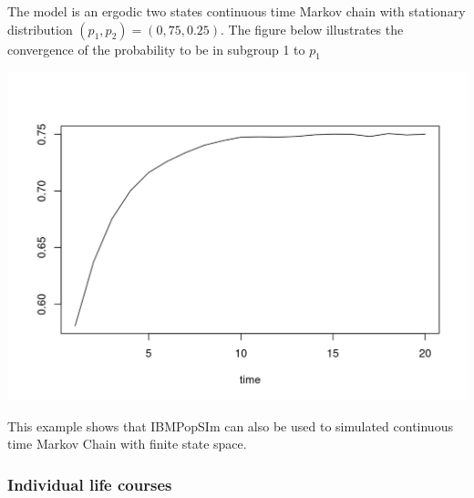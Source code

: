 The model is an ergodic two states continuous time Markov chain with stationary distribution \((p_1,p_2)=(0,75,0.25)\). The figure below illustrates the convergence of the probability to be in subgroup 1 to \(p_1\)

\begin{Shaded}
\begin{Highlighting}[]
\OtherTok{\textless{}{-}} 
\OtherTok{\textless{}{-}} \SpecialCharTok{$}
                      \NormalTok{(}\NormalTok{(}\SpecialCharTok{==}\NormalTok{))}\SpecialCharTok{/}
\NormalTok{                \})}
\end{Highlighting}
\end{Shaded}

\begin{center}\includegraphics{main_prob_subgroup1-1} \end{center}

This example shows that IBMPopSIm can also be used to simulated continuous time Markov Chain with finite state space.

\hypertarget{individual-life-courses}{%
\subsubsection{Individual life courses}\label{individual-life-courses}}

